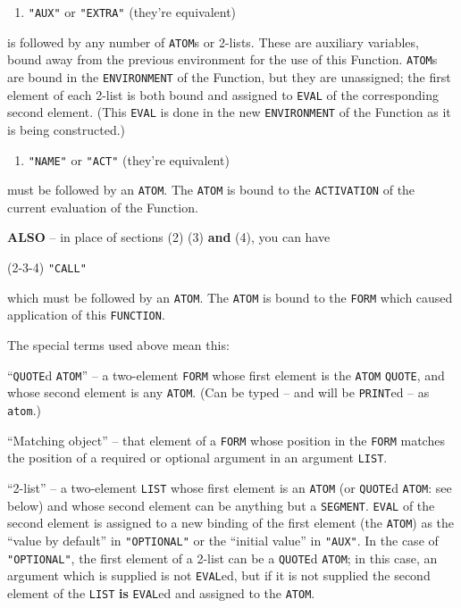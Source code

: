 \documentclass[a4paper]{scrbook}
\providecommand{\tightlist}{%
  \setlength{\itemsep}{0pt}\setlength{\parskip}{0pt}}
\begin{document}
\begin{enumerate}
\def\labelenumi{(\arabic{enumi})}
\setcounter{enumi}{4}
\tightlist
\item
  \texttt{"AUX"} or \texttt{"EXTRA"}   (they're equivalent)
\end{enumerate}

is followed by any number of \texttt{ATOM}s or 2-lists. These are auxiliary variables, bound away from the previous
environment for the use of this Function. \texttt{ATOM}s are bound in the \texttt{ENVIRONMENT} of the Function, but they
are unassigned; the first element of each 2-list is both bound and assigned to \texttt{EVAL} of the corresponding second
element. (This \texttt{EVAL} is done in the new \texttt{ENVIRONMENT} of the Function as it is being constructed.)

\begin{enumerate}
\def\labelenumi{(\arabic{enumi})}
\setcounter{enumi}{5}
\tightlist
\item
  \texttt{"NAME"}  or \texttt{"ACT"}  (they're equivalent)
\end{enumerate}

must be followed by an \texttt{ATOM}. The \texttt{ATOM} is bound to the \texttt{ACTIVATION} of the current evaluation of
the Function.

\textbf{ALSO} -- in place of sections (2) (3) \textbf{and} (4), you can have 

(2-3-4) \texttt{"CALL"}

which must be followed by an \texttt{ATOM}. The \texttt{ATOM} is bound to the \texttt{FORM} which caused application of
this \texttt{FUNCTION}.

The special terms used above mean this:

``\texttt{QUOTE}d \texttt{ATOM}'' -- a two-element \texttt{FORM} whose first element is the \texttt{ATOM} \texttt{QUOTE},
and whose second element is any \texttt{ATOM}. (Can be typed -- and will be \texttt{PRINT}ed -- as
\texttt{\textquotesingle{}atom}.)

``Matching object'' -- that element of a \texttt{FORM} whose position in the \texttt{FORM} matches the position of a
required or optional argument in an argument \texttt{LIST}.

``2-list'' -- a two-element \texttt{LIST} whose first element is an \texttt{ATOM} (or \texttt{QUOTE}d \texttt{ATOM}: see
below) and whose second element can be anything but a \texttt{SEGMENT}. \texttt{EVAL} of the second element is assigned to
a new binding of the first element (the \texttt{ATOM}) as the ``value by default'' in \texttt{"OPTIONAL"} or the ``initial
value'' in \texttt{"AUX"}. In the case of \texttt{"OPTIONAL"}, the first element of a 2-list can be a \texttt{QUOTE}d
\texttt{ATOM}; in this case, an argument which is supplied is not \texttt{EVAL}ed, but if it is not supplied the second
element of the \texttt{LIST} \textbf{is} \texttt{EVAL}ed and assigned to the \texttt{ATOM}.
\end{document}
